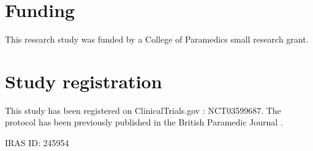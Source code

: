 \documentclass[]{article}
\begin{document}
\hypertarget{funding}{%
\section{Funding}\label{funding}}

This research study was funded by a College of Paramedics small research
grant.

\hypertarget{study-registration}{%
\section{Study registration}\label{study-registration}}

This study has been registered on ClinicalTrials.gov : NCT03599687. The
protocol has been previously published in the British Paramedic Journal
\citep{pilbery_soiled_2018}.

IRAS ID: 245954


\end{document}
